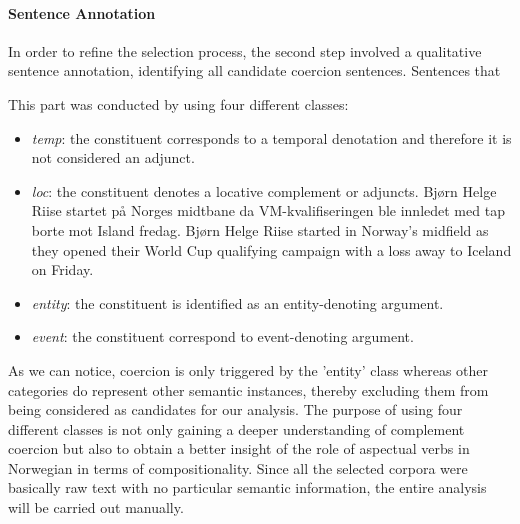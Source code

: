 \documentclass{article}
\begin{document}
\paragraph{Sentence Annotation}
In order to refine the selection process, the second step involved a qualitative sentence annotation, identifying all candidate coercion sentences. Sentences that 


This part was conducted by using four different classes:
\begin{itemize}
    \item \textit{temp}: the constituent corresponds to a temporal denotation and therefore it is not considered an adjunct. 
    \item \textit{loc}: the constituent denotes a locative complement or adjuncts.  Bjørn Helge Riise startet på Norges midtbane da VM-kvalifiseringen ble innledet med tap borte mot Island fredag. Bjørn Helge Riise started in Norway's midfield as they opened their World Cup qualifying campaign with a loss away to Iceland on Friday.
    \item \textit{entity}: the constituent is identified as  an entity-denoting argument.
    \item \textit{event}: the constituent correspond to event-denoting argument.
\end{itemize}
As we can notice, coercion is only triggered by the 'entity' class whereas other categories do represent other semantic instances, thereby excluding them from being considered as candidates for our analysis. The purpose of using four different classes is not only gaining a deeper understanding of complement coercion but also to obtain a better insight of the role of aspectual verbs in Norwegian in terms of compositionality. Since all the selected corpora were basically raw text with no particular semantic information, the entire analysis will be carried out manually. 



\end{document}
